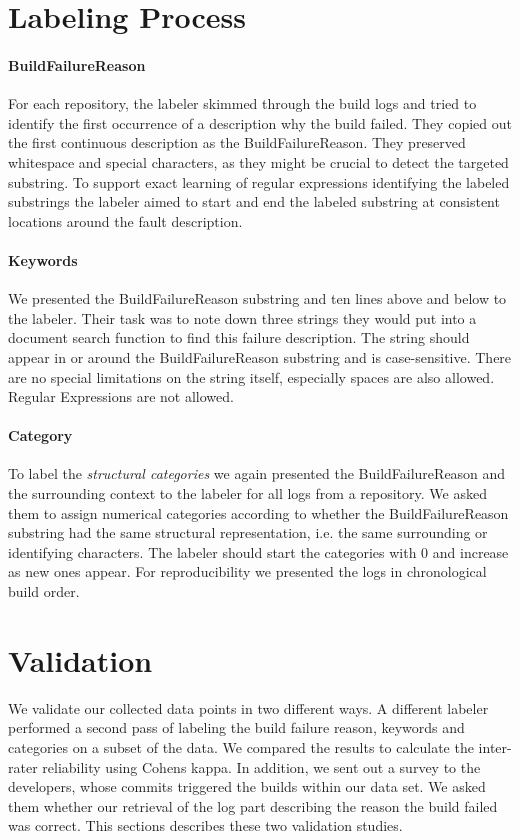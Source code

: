 \documentclass[\myrootdir/main.tex]{subfiles}
\begin{document}
\section{Labeling Process}
\label{sec:labeling-process}

\paragraph{BuildFailureReason}
For each repository, the labeler skimmed through the build logs and tried to identify the first occurrence of a description why the build failed.
They copied out the first continuous description as the BuildFailureReason.
They preserved whitespace and special characters, as they might be crucial to detect the targeted substring.
To support exact learning of regular expressions identifying the labeled substrings the labeler aimed to start and end the labeled substring at consistent locations around the fault description.

\paragraph{Keywords}
We presented the BuildFailureReason substring and ten lines above and below to the labeler.
Their task was to note down three strings they would put into a document search function to find this failure description.
The string should appear in or around the BuildFailureReason substring and is case-sensitive.
There are no special limitations on the string itself, especially spaces are also allowed.
Regular Expressions are not allowed.

\paragraph{Category}
To label the \emph{structural categories} we again presented the BuildFailureReason and the surrounding context to the labeler for all logs from a repository.
We asked them to assign numerical categories according to whether the BuildFailureReason substring had the same structural representation, i.e. the same surrounding or identifying characters.
The labeler should start the categories with 0 and increase as new ones appear.
For reproducibility we presented the logs in chronological build order.

\section{Validation}
We validate our collected data points in two different ways.
A different labeler performed a second pass of labeling the build failure reason, keywords and categories on a subset of the data.
We compared the results to calculate the inter-rater reliability using Cohens kappa.
In addition, we sent out a survey to the developers, whose commits triggered the builds within our data set.
We asked them whether our retrieval of the log part describing the reason the build failed was correct.
This sections describes these two validation studies.
\end{document}
